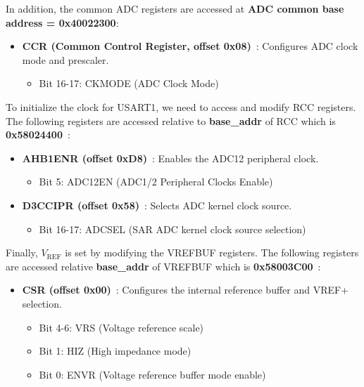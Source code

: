 \documentclass[12pt,a4paper]{article}
\begin{document}
In addition, the common ADC registers are accessed at \textbf{ADC common base address = 0x40022300}:

\begin{itemize}
    \item \textbf{CCR (Common Control Register, offset 0x08)}~\cite[pp.~918]{ref-manual}: Configures ADC clock mode and prescaler.
    \begin{itemize}
        \item Bit 16-17: CKMODE (ADC Clock Mode)
    \end{itemize}
\end{itemize}

To initialize the clock for USART1, we need to access and modify RCC registers. The following registers are accessed relative to \textbf{base\_addr} of RCC which is \textbf{0x58024400}~\cite[pp.~132]{ref-manual}:

\begin{itemize}
    \item \textbf{AHB1ENR (offset 0xD8)}~\cite[pp.~467]{ref-manual}: Enables the ADC12 peripheral clock.
    \begin{itemize}
        \item Bit 5: ADC12EN (ADC1/2 Peripheral Clocks Enable)
    \end{itemize}
    \item \textbf{D3CCIPR (offset 0x58)}~\cite[pp.~417]{ref-manual}: Selects ADC kernel clock source.
    \begin{itemize}
        \item Bit 16-17: ADCSEL (SAR ADC kernel clock source selection)
    \end{itemize}
\end{itemize}

Finally, $V_{\text{REF}}$ is set by modifying the VREFBUF registers. The following registers are accessed relative \textbf{base\_addr} of VREFBUF which is \textbf{0x58003C00}~\cite[pp.~133]{ref-manual}:

\begin{itemize}

    \item \textbf{CSR (offset 0x00)}~\cite[pp.~297]{ref-manual}: Configures the internal reference buffer and VREF+ selection.
    \begin{itemize}
        \item Bit 4-6: VRS (Voltage reference scale)
        \item Bit 1: HIZ (High impedance mode)
        \item Bit 0: ENVR (Voltage reference buffer mode enable)
    \end{itemize}
\end{itemize}
\end{document}
